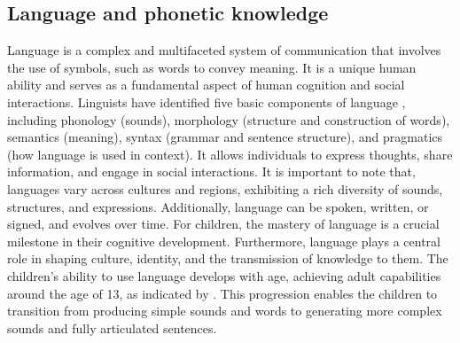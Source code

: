 \subsection{Language and phonetic knowledge} %
\label{subsection:mispron}
Language is a complex and multifaceted system of communication that involves the use of symbols, such as words to convey meaning. It is a unique human ability and serves as a fundamental aspect of human cognition and social interactions. Linguists have identified five basic components of language \cite{moats2000speech}, including phonology (sounds), morphology (structure and construction of words), semantics (meaning), syntax (grammar and sentence structure), and pragmatics (how language is used in context). It allows individuals to express thoughts, share information, and engage in social interactions. It is important to note that, languages vary across cultures and regions, exhibiting a rich diversity of sounds, structures, and expressions. Additionally, language can be spoken, written, or signed, and evolves over time. For children, the mastery of language is a crucial milestone in their cognitive development. Furthermore, language plays a central role in shaping culture, identity, and the transmission of knowledge to them. The children's ability to use language develops with age, achieving adult capabilities around the age of 13, as indicated by \cite{Acoustic_change_children}. This progression enables the children to transition from producing simple sounds and words to generating more complex sounds and fully articulated sentences.

